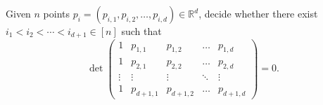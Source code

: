\begin{problem}
	Given \(n\) points \(p_i = (p_{i,1},p_{i,2}, \ldots, p_{i,d}) \in \mathbb{R}^d\), decide
	whether there exist \(i_1 < i_2 < \cdots < i_{d+1} \in [n]\) such that
	\begin{displaymath}
		\det
		\left(
		\begin{matrix}
			1 & p_{1,1} & p_{1,2} & \hdots & p_{1,d} \\
			1 & p_{2,1} & p_{2,2} & \hdots & p_{2,d} \\
			\vdots & \vdots & \vdots & \ddots & \vdots \\
			1 & p_{d+1,1} & p_{d+1,2} & \hdots & p_{d+1,d}
		\end{matrix}
		\right)
		= 0.
	\end{displaymath}
\end{problem}
